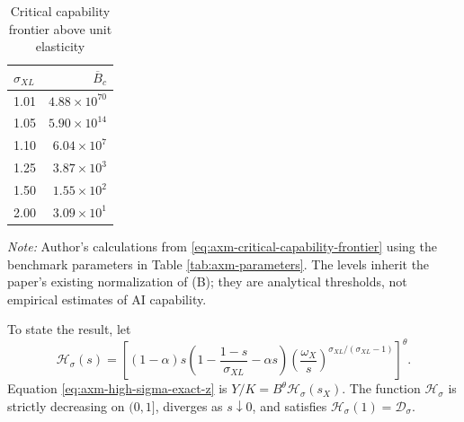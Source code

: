 \begin{table}[H]
 \centering
 \caption{Critical capability frontier above unit elasticity}
 \label{tab:axm-critical-capability-frontier}
 \begin{tabular}{@{}lr@{}}
  \toprule
  \(\sigma_{XL}\) & \(\overline B_c\) \\
  \midrule
  1.01 & \(4.88\times10^{70}\) \\
  1.05 & \(5.90\times10^{14}\) \\
  1.10 & \(6.04\times10^{7}\) \\
  1.25 & \(3.87\times10^{3}\) \\
  1.50 & \(1.55\times10^{2}\) \\
  2.00 & \(3.09\times10^{1}\) \\
  \bottomrule
 \end{tabular}
 \begin{minipage}{0.84\textwidth}
  \footnotesize
  \emph{Note:} Author's calculations from
  \eqref{eq:axm-critical-capability-frontier} using the benchmark parameters
  in Table \ref{tab:axm-parameters}. The levels inherit the paper's existing
  normalization of (B); they are analytical thresholds, not empirical
  estimates of AI capability.
 \end{minipage}
\end{table}

To state the result, let
\begin{equation}
 \mathcal H_\sigma(s)=
 \left[
  (1-\alpha)s
  \left(1-\frac{1-s}{\sigma_{XL}}-\alpha s\right)
  \left(\frac{\omega_X}{s}\right)^{
   \sigma_{XL}/(\sigma_{XL}-1)}
 \right]^\theta.
 \label{eq:axm-capped-share-map}
\end{equation}
Equation \eqref{eq:axm-high-sigma-exact-z} is
\(Y/K=B^\theta\mathcal H_\sigma(s_X)\). The function
\(\mathcal H_\sigma\) is strictly decreasing on \((0,1]\), diverges as
\(s\downarrow0\), and satisfies
\(\mathcal H_\sigma(1)=\mathcal D_\sigma\).


